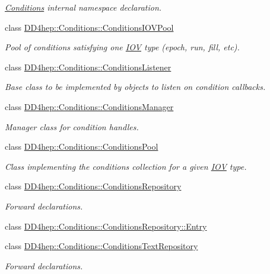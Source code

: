 \begin{DoxyCompactItemize}
\begin{DoxyCompactList}\small\item\em \hyperlink{namespace_d_d4hep_1_1_conditions}{Conditions} internal namespace declaration. \item\end{DoxyCompactList}\item 
class \hyperlink{class_d_d4hep_1_1_conditions_1_1_conditions_i_o_v_pool}{DD4hep::Conditions::ConditionsIOVPool}
\begin{DoxyCompactList}\small\item\em Pool of conditions satisfying one \hyperlink{class_d_d4hep_1_1_i_o_v}{IOV} type (epoch, run, fill, etc). \item\end{DoxyCompactList}\item 
class \hyperlink{class_d_d4hep_1_1_conditions_1_1_conditions_listener}{DD4hep::Conditions::ConditionsListener}
\begin{DoxyCompactList}\small\item\em Base class to be implemented by objects to listen on condition callbacks. \item\end{DoxyCompactList}\item 
class \hyperlink{class_d_d4hep_1_1_conditions_1_1_conditions_manager}{DD4hep::Conditions::ConditionsManager}
\begin{DoxyCompactList}\small\item\em Manager class for condition handles. \item\end{DoxyCompactList}\item 
class \hyperlink{class_d_d4hep_1_1_conditions_1_1_conditions_pool}{DD4hep::Conditions::ConditionsPool}
\begin{DoxyCompactList}\small\item\em Class implementing the conditions collection for a given \hyperlink{class_d_d4hep_1_1_i_o_v}{IOV} type. \item\end{DoxyCompactList}\item 
class \hyperlink{class_d_d4hep_1_1_conditions_1_1_conditions_repository}{DD4hep::Conditions::ConditionsRepository}
\begin{DoxyCompactList}\small\item\em Forward declarations. \item\end{DoxyCompactList}\item 
class \hyperlink{class_d_d4hep_1_1_conditions_1_1_conditions_repository_1_1_entry}{DD4hep::Conditions::ConditionsRepository::Entry}
\item 
class \hyperlink{class_d_d4hep_1_1_conditions_1_1_conditions_text_repository}{DD4hep::Conditions::ConditionsTextRepository}
\begin{DoxyCompactList}\small\item\em Forward declarations. \item\end{DoxyCompactList}\end{DoxyCompactItemize}
